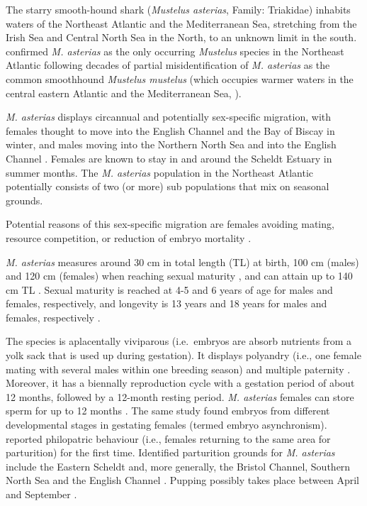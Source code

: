 \documentclass[
  authoryear,
  review,
  3p]{elsarticle}
\begin{document}
The starry smooth-hound shark (\emph{Mustelus asterias}, Family:
Triakidae) inhabits waters of the Northeast Atlantic and the
Mediterranean Sea, stretching from the Irish Sea and Central North Sea
in the North, to an unknown limit in the south. \citet{farrell_2009}
confirmed \emph{M. asterias} as the only occurring \emph{Mustelus}
species in the Northeast Atlantic following decades of partial
misidentification of \emph{M. asterias} as the common smoothhound
\emph{Mustelus mustelus} (which occupies warmer waters in the central
eastern Atlantic and the Mediterranean Sea, \citet{farrell_2015}).

\emph{M. asterias} displays circannual and potentially sex-specific
migration, with females thought to move into the English Channel and the
Bay of Biscay in winter, and males moving into the Northern North Sea
and into the English Channel \citep{breve_2020}. Females are known to
stay in and around the Scheldt Estuary in summer months. The \emph{M.
asterias} population in the Northeast Atlantic potentially consists of
two (or more) sub populations \citep{breve_2016, griffiths_2020} that
mix on seasonal grounds.

Potential reasons of this sex-specific migration are females avoiding
mating, resource competition, or reduction of embryo mortality
\citep{speed_2010}.

\emph{M. asterias} measures around 30 cm in total length (TL) at birth,
100 cm (males) and 120 cm (females) when reaching sexual maturity
\citep{farrell_2010}, and can attain up to 140 cm TL
\citep{mccullyphillips_2015}. Sexual maturity is reached at 4-5 and 6
years of age for males and females, respectively, and longevity is 13
years and 18 years for males and females, respectively
\citep{farrell_2010}.

The species is aplacentally viviparous (i.e.~embryos are absorb
nutrients from a yolk sack that is used up during gestation). It
displays polyandry (i.e., one female mating with several males within
one breeding season) and multiple paternity \citep[i.e., pups within one
litter originating from several males,][]{farrell_2014}. Moreover, it
has a biennally reproduction cycle with a gestation period of about 12
months, followed by a 12-month resting period. \emph{M. asterias}
females can store sperm for up to 12 months \citep{farrell_2010a}. The
same study found embryos from different developmental stages in
gestating females (termed embryo asynchronism). \citet{griffiths_2020}
reported philopatric behaviour (i.e., females returning to the same area
for parturition) for the first time. Identified parturition grounds for
\emph{M. asterias} include the Eastern Scheldt and, more generally, the
Bristol Channel, Southern North Sea and the English Channel
\citep{dureuil_2013, mccullyphillips_2015, breve_2016}. Pupping possibly
takes place between April and September
\citep{farrell_2010a, mccullyphillips_2015}.
\end{document}
